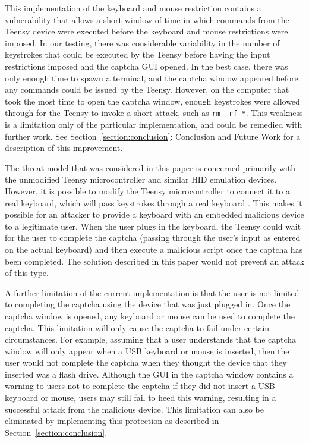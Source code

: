 \documentclass[pagenumbers]{ieee}
\begin{document}
This implementation of the keyboard and mouse restriction contains a vulnerability that allows a short window of time in which commands from the Teensy device were executed before the keyboard and mouse restrictions were imposed. In our testing, there was considerable variability in the number of keystrokes that could be executed by the Teensy before having the input restrictions imposed and the captcha GUI opened. In the best case, there was only enough time to spawn a terminal, and the captcha window appeared before any commands could be issued by the Teensy. However, on the computer that took the most time to open the captcha window, enough keystrokes were allowed through for the Teensy to invoke a short attack, such as \texttt{rm -rf *}.  This weakness is a limitation only of the particular implementation, and could be remedied with further work. See Section~\ref{section:conclusion}: Conclusion and Future Work for a description of this improvement.

The threat model that was considered in this paper is concerned primarily with the unmodified Teensy microcontroller and similar HID emulation devices. However, it is possible to modify the Teensy microcontroller to connect it to a real keyboard, which will pass keystrokes through a real keyboard \cite{pjrc}. This makes it possible for an attacker to provide a keyboard with an embedded malicious device to a legitimate user. When the user plugs in the keyboard, the Teensy could wait for the user to complete the captcha (passing through the user's input as entered on the actual keyboard) and then execute a malicious script once the captcha has been completed. The solution described in this paper would not prevent an attack of this type.

A further limitation of the current implementation is that the user is not limited to completing the captcha using the device that was just plugged in.  Once the captcha window is opened, any keyboard or mouse can be used to complete the captcha. This limitation will only cause the captcha to fail under certain circumstances. For example, assuming that a user understands that the captcha window will only appear when a USB keyboard or mouse is inserted, then the user would not complete the captcha when they thought the device that they inserted was a flash drive. Although the GUI in the captcha window contains a warning to users not to complete the captcha if they did not insert a USB keyboard or mouse, users may still fail to heed this warning, resulting in a successful attack from the malicious device. This limitation can also be eliminated by implementing this protection as described in Section~\ref{section:conclusion}.
\end{document}
